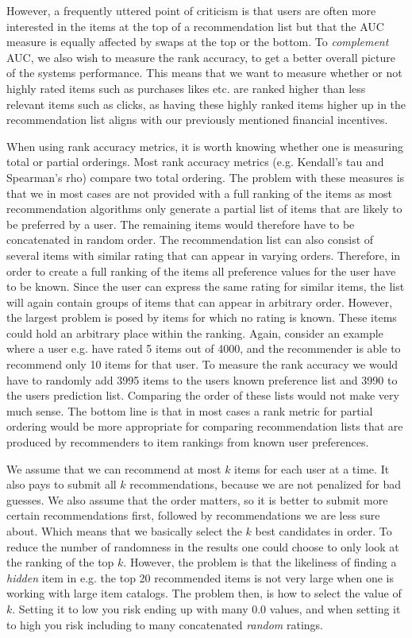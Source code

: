 However, a frequently uttered point of criticism is that users are often more interested in the items
at the top of a recommendation list but that the AUC measure is equally affected by swaps at the top
or the bottom. To \emph{complement} AUC, we also wish to measure the rank accuracy, to get a better
overall picture of the systems performance. This means that we want to measure whether or not
highly rated items such as purchases likes etc. are ranked higher than less relevant items such as clicks,
as having these highly ranked items higher up in the recommendation list aligns with our previously
mentioned financial incentives.


When using rank accuracy metrics, it is worth knowing whether one is measuring total or partial orderings.
Most rank accuracy metrics (e.g. Kendall's tau and Spearman's rho) compare two total ordering. The problem
with these measures is that we in most cases are not provided with a full ranking of the items as most recommendation
algorithms only generate a partial list of items that are likely to be preferred by a user. The remaining items
would therefore have to be concatenated in random order. The recommendation list can also consist of several
items with similar rating that can appear in varying orders. Therefore, in order to create a full ranking of
the items all preference values for the user have to be known. Since the user can express the same rating for similar
items, the list will again contain groups of items that can appear in arbitrary order. However, the largest problem
is posed by items for which no rating is known. These items could hold an arbitrary place within the ranking.
Again, consider an example where a user e.g. have rated 5 items out of 4000, and the recommender is able to recommend
only 10 items for that user. To measure the rank accuracy we would have to randomly add 3995 items to the users known
preference list and 3990 to the users prediction list. Comparing the order of these lists would not make very much sense.
The bottom line is that in most cases a rank metric for partial ordering would be more appropriate for comparing
recommendation lists that are produced by recommenders to item rankings from known user preferences.

We assume that we can recommend at most $k$ items for each user at a time. It also pays to submit all $k$
recommendations, because we are not penalized for bad guesses. We also assume that the order matters, so it
is better to submit more certain recommendations first, followed by recommendations we are less sure about.
Which means that we basically select the $k$ best candidates in order. To reduce the number of randomness in
the results one could choose to only look at the ranking of the top $k$. However, the problem is that the
likeliness of finding a \emph{hidden} item in e.g. the top 20 recommended items is not very large when one is working
with large item catalogs. The problem then, is how to select the value of $k$. Setting it to low you risk
ending up with many $0.0$ values, and when setting it to high you risk including to many concatenated \emph{random}
ratings.

